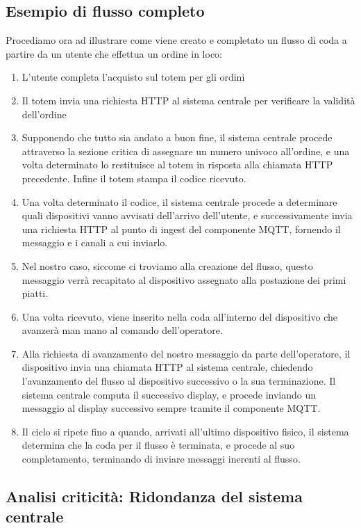 \documentclass[a4paper, titlepage, 12pt, openright, twoside]{book}
\begin{document}
\subsection{Esempio di flusso completo}
Procediamo ora ad illustrare come viene creato e completato un flusso di coda a partire da un utente che effettua un ordine in loco:
\begin{enumerate}
	\item L'utente completa l'acquisto sul totem per gli ordini
	\item Il totem invia una richiesta HTTP al sistema centrale per verificare la validità dell'ordine
	\item Supponendo che tutto sia andato a buon fine, il sistema centrale procede attraverso la sezione critica di assegnare un numero univoco all'ordine,
		  e una volta determinato lo restituisce al totem in risposta alla chiamata HTTP precedente. Infine il totem stampa il codice ricevuto.
	\item Una volta determinato il codice, il sistema centrale procede a determinare quali dispositivi vanno avvisati dell'arrivo dell'utente, e successivamente
		  invia una richiesta HTTP al punto di ingest del componente MQTT, fornendo il messaggio e i canali a cui inviarlo.
	\item Nel nostro caso, siccome ci troviamo alla creazione del flusso, questo messaggio verrà recapitato al dispositivo assegnato alla postazione dei primi piatti.
	\item Una volta ricevuto, viene inserito nella coda all'interno del dispositivo che avanzerà man mano al comando dell'operatore.
	\item Alla richiesta di avanzamento del nostro messaggio da parte dell'operatore, il dispositivo invia una chiamata HTTP al sistema centrale, chiedendo l'avanzamento del flusso
		  al dispositivo successivo o la sua terminazione. Il sistema centrale computa il successivo display, e procede inviando un messaggio al display successivo sempre tramite
		  il componente MQTT.
	\item Il ciclo si ripete fino a quando, arrivati all'ultimo dispositivo fisico, il sistema determina che la coda per il flusso è terminata, e procede al suo completamento,
		  terminando di inviare messaggi inerenti al flusso. 
\end{enumerate}

\subsection{Analisi criticità: Ridondanza del sistema centrale}
\end{document}
